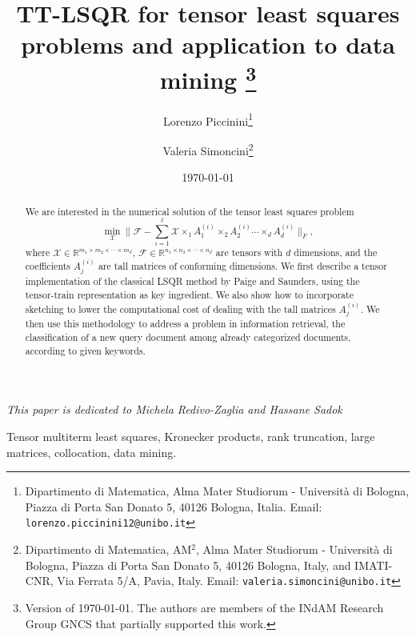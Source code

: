 \documentclass{siamart190516}
\newcommand{\cc}[1]{\mathcal{#1}}
\newcommand{\bb}[1]{\mathbb{#1}}
\begin{document}
\title{TT-LSQR for tensor least squares problems and application to data mining
\thanks{Version of \today. The authors are members of the INdAM 
Research Group GNCS that partially supported this  work.} }{}
\date{\today}
\author{ Lorenzo Piccinini\thanks{Dipartimento di Matematica, 
        Alma Mater Studiorum - Universit\`a di Bologna, Piazza di Porta San Donato 5,
        40126 Bologna, Italia. Email:
{\tt  lorenzo.piccinini12@unibo.it}}\and Valeria Simoncini\thanks{Dipartimento di Matematica, AM$^2$,
        Alma Mater Studiorum - Universit\`a di Bologna, Piazza di Porta San Donato 5,    40126 Bologna, Italy, and IMATI-CNR, Via Ferrata 5/A, Pavia, Italy. Email:
{\tt valeria.simoncini@unibo.it}}}




\maketitle
\begin{center}
    {\it This paper is dedicated to Michela Redivo-Zaglia and  Hassane Sadok}
\end{center}


\begin{abstract}
We are interested in the numerical solution of the tensor least squares problem 
\begin{equation*}
    \min_{\cc{X}} \| \cc{F} - \sum_{i =1}^{\ell} \cc{X} \times_1 A_1^{(i)} \times_2 A_2^{(i)} \cdots \times_d A_d^{(i)} \|_F,
\end{equation*}
where $\cc{X}\in\bb{R}^{m_1 \times m_2 \times \cdots \times m_d}$, $\cc{F}\in\bb{R}^{n_1\times n_2 \times \cdots \times n_d}$ are tensors with $d$ dimensions, and
the coefficients $A_j^{(i)}$ are tall matrices of conforming dimensions. We first
describe a tensor implementation of the classical 
LSQR method by Paige and Saunders, using the tensor-train
representation as key ingredient. We also show how to incorporate
sketching to lower the computational cost of dealing
with the tall matrices $A_j^{(i)}$.
We then use this methodology
to address a problem in information retrieval, the 
classification of a new query document among already
categorized documents, according to given keywords.
\end{abstract}

\begin{keywords}
Tensor multiterm least squares, Kronecker products, rank truncation, large matrices, collocation, data mining.
\end{keywords}
\end{document}
